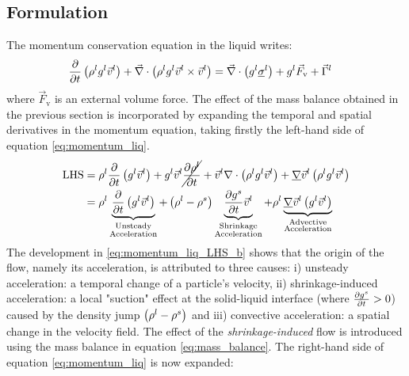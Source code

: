 \subsection{Formulation}
The momentum conservation equation in the liquid writes:
\begin{align}
\label{eq:momentum_liq}
& \frac{\partial}{\partial t} \left( \rho^l {g^l} \vec{v}^l  \right)  + \vec{\nabla} \cdot \left( \rho^l {g^l} \vec{v}^l \times \vec{v}^l \right) = 
	\vec{\nabla} \cdot \left( {g^l} \underline{\sigma}^l \right) + {g^l} \vec{F}_\text{v} + \vec{\Gamma}^{l}
\end{align}
where $\vec{F}_\text{v}$ is an external volume force. The effect of the mass balance obtained in the previous section 
is incorporated by expanding the temporal and spatial derivatives in the momentum equation, taking firstly the left-hand side of equation \eqref{eq:momentum_liq}.
\begin{subequations}
\begin{align}
\label{eq:momentum_liq_LHS_a}
	 \text{LHS} &=
	 \rho^l \frac{\partial}{\partial t} \left(  {g^l} \vec{v}^l  \right)  + {g^l} \vec{v}^l \cancel{\frac{\partial \rho^l}{\partial t}} 
	+ \vec{v}^l \nabla \cdot \left(  \rho^l {g^l} \vec{v}^l  \right) 
	+ \underline{\nabla} \vec{v}^l \left(  \rho^l {g^l} \vec{v}^l  \right) \\
\label{eq:momentum_liq_LHS_b}
	&= \rho^l \underbrace{ \frac{\partial}{\partial t} \left(  {g^l} \vec{v}^l  \right)  }_{\substack{\text{Unsteady} \\ \text{Acceleration}}}
	 + \left(  \rho^l - \rho^s  \right) \underbrace{ \frac{\partial  {g^s} }{\partial t} \vec{v}^l}
	    _{\substack{\text{Shrinkage}\\ \text{Acceleration}}}
	+ \rho^l  \underbrace{ \underline{\nabla} \vec{v}^l \left(  {g^l} \vec{v}^l  \right)}_{\substack{\text{Advective} \\ \text{Acceleration}}}     
\end{align}
\end{subequations}
The development in \eqref{eq:momentum_liq_LHS_b} shows that the origin of the flow, namely its acceleration, is 
attributed to three causes: 
 i) unsteady acceleration: a temporal change of a particle's velocity, ii) shrinkage-induced acceleration: a local "suction" effect at the solid-liquid interface (where $\frac{\partial  {g^s} }{\partial t} >0$) caused by the density jump $\left(  \rho^l - \rho^s  \right)$
and iii) convective acceleration: a spatial change in the velocity field.
The effect of the \emph{shrinkage-induced} flow is introduced using the mass balance in equation \eqref{eq:mass_balance}. The right-hand side of equation \eqref{eq:momentum_liq} is now expanded:
